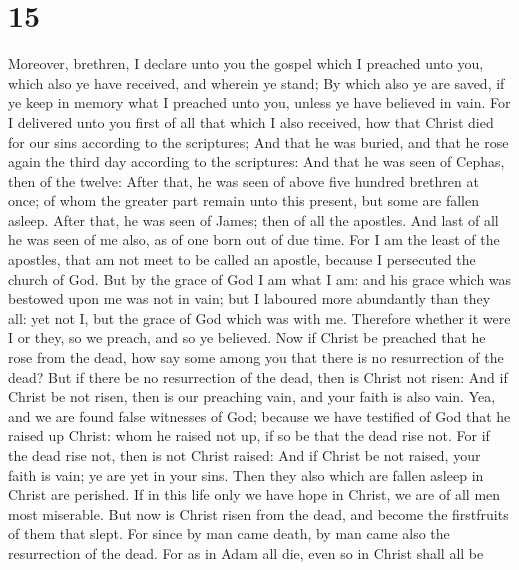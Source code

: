 \hypertarget{section-14}{%
\section{15}\label{section-14}}

 Moreover, brethren, I declare unto you the gospel which I
preached unto you, which also ye have received, and wherein ye stand;
 By which also ye are saved, if ye keep in memory what I
preached unto you, unless ye have believed in vain.  For I
delivered unto you first of all that which I also received, how that
Christ died for our sins according to the scriptures;  And
that he was buried, and that he rose again the third day according to
the scriptures:  And that he was seen of Cephas, then of the
twelve:  After that, he was seen of above five hundred
brethren at once; of whom the greater part remain unto this present, but
some are fallen asleep.  After that, he was seen of James;
then of all the apostles.  And last of all he was seen of me
also, as of one born out of due time.  For I am the least of
the apostles, that am not meet to be called an apostle, because I
persecuted the church of God.  But by the grace of God I am
what I am: and his grace which was bestowed upon me was not in vain; but
I laboured more abundantly than they all: yet not I, but the grace of
God which was with me.  Therefore whether it were I or
they, so we preach, and so ye believed.  Now if Christ be
preached that he rose from the dead, how say some among you that there
is no resurrection of the dead?  But if there be no
resurrection of the dead, then is Christ not risen:  And if
Christ be not risen, then is our preaching vain, and your faith is also
vain.  Yea, and we are found false witnesses of God;
because we have testified of God that he raised up Christ: whom he
raised not up, if so be that the dead rise not.  For if the
dead rise not, then is not Christ raised:  And if Christ be
not raised, your faith is vain; ye are yet in your sins. 
Then they also which are fallen asleep in Christ are perished.
 If in this life only we have hope in Christ, we are of all
men most miserable.  But now is Christ risen from the dead,
and become the firstfruits of them that slept.  For since
by man came death, by man came also the resurrection of the dead.
 For as in Adam all die, even so in Christ shall all be
